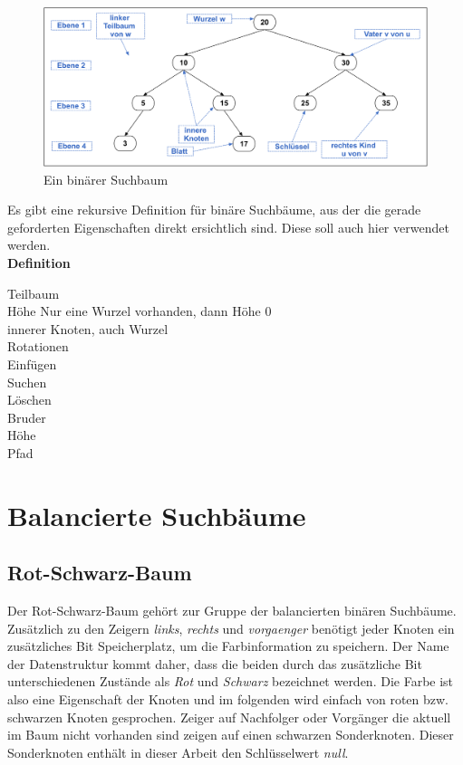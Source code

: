\documentclass[a4paper,12pt]{article}
\begin{document}
\begin{figure}[h]
	\centering
	\includegraphics[width= 1\textwidth]{"Medien/Einleitung/IoSuchbaum"}
	\caption{Ein binärer Suchbaum }
	\label{fig:IoSuchbaum}
\end{figure}

Es gibt eine rekursive Definition für binäre Suchbäume, aus der die gerade geforderten Eigenschaften direkt ersichtlich sind.
Diese soll auch hier verwendet werden.\\ 

\textbf{Definition} 




\noindent 



Teilbaum\\
Höhe Nur eine Wurzel vorhanden, dann Höhe 0\\
innerer Knoten, auch Wurzel\\
Rotationen\\
Einfügen\\
Suchen\\
Löschen\\
Bruder\\
Höhe\\
Pfad\\
\section{Balancierte Suchbäume}
\subsection{Rot-Schwarz-Baum}
Der Rot-Schwarz-Baum gehört zur Gruppe der balancierten binären Suchbäume. Zusätzlich zu den Zeigern \textit{links}, \textit{rechts} und \textit{vorgaenger} benötigt jeder Knoten ein zusätzliches Bit Speicherplatz, um die Farbinformation zu speichern. Der Name der Datenstruktur kommt daher, dass die beiden durch das zusätzliche Bit unterschiedenen Zustände als \textit{Rot} und \textit{Schwarz} bezeichnet werden. Die Farbe ist also eine Eigenschaft der Knoten und im folgenden wird einfach von roten bzw. schwarzen Knoten gesprochen. Zeiger auf Nachfolger oder Vorgänger die aktuell im Baum nicht vorhanden sind zeigen auf einen schwarzen Sonderknoten. Dieser Sonderknoten enthält in dieser Arbeit den Schlüsselwert \textit{null}.  
\end{document}
